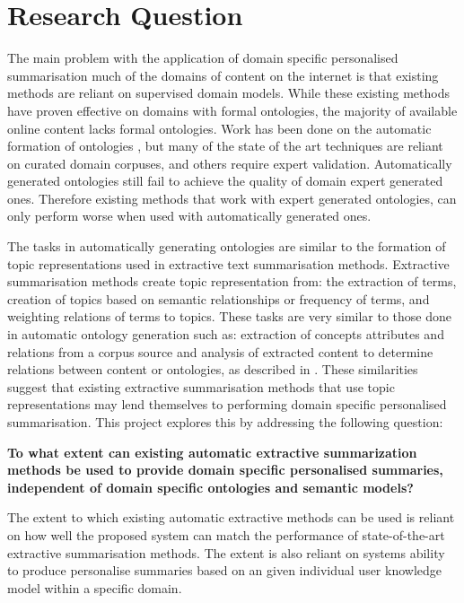 \section{Research Question}

The main problem with the application of domain specific personalised summarisation much of the domains of content on the internet is that existing methods are reliant on supervised domain models. While these existing methods have proven effective on domains with formal ontologies, the majority of available online content lacks formal ontologies. Work has been done on the automatic formation of ontologies \citep{bedini2007automatic}, but many of the state of the art techniques are reliant on curated domain corpuses, and others require expert validation. Automatically generated ontologies still fail to achieve the quality of domain expert generated ones. Therefore existing methods that work with expert generated ontologies, can only perform worse when used with automatically generated ones.

The tasks in automatically generating ontologies are similar to the formation of topic representations used in extractive text summarisation methods. Extractive summarisation methods create topic representation from: the extraction of terms, creation of topics based on semantic relationships or frequency of terms, and weighting relations of terms to topics. These tasks are very similar to those done in automatic ontology generation such as: extraction of concepts attributes and relations from a corpus source and analysis of extracted content to determine relations between content or ontologies, as described in \citep{bedini2007automatic}. These similarities suggest that existing extractive summarisation methods that use topic representations may lend themselves to performing domain specific personalised summarisation. This project explores this by addressing the following question:

\textbf{To what extent can existing automatic extractive summarization methods be used to provide domain specific personalised summaries, independent of domain specific ontologies and semantic models?}

The extent to which existing automatic extractive methods can be used is reliant on how well the proposed system can match the performance of state-of-the-art extractive summarisation methods. The extent is also reliant on systems ability to produce personalise summaries based on an given individual user knowledge model within a specific domain.

